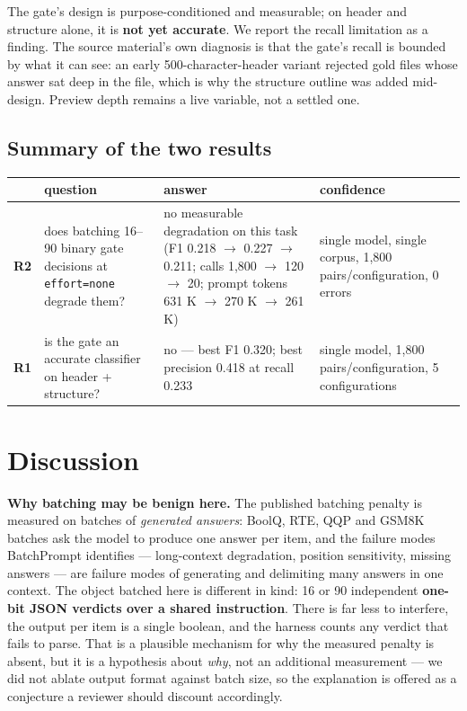 \documentclass[11pt,a4paper]{article}
\begin{document}
The gate's design is purpose-conditioned and measurable; on header and structure alone, it is \textbf{not yet accurate}. We report the recall limitation as a finding. The source material's own diagnosis is that the gate's recall is bounded by what it can see: an early 500-character-header variant rejected gold files whose answer sat deep in the file, which is why the structure outline was added mid-design. Preview depth remains a live variable, not a settled one.

\subsection{Summary of the two results}


\begin{center}
\begin{tabular}{@{}>{\raggedright\arraybackslash}p{}>{\raggedright\arraybackslash}p{}>{\raggedright\arraybackslash}p{}>{\raggedright\arraybackslash}p{}@{}}
\hline
\textbf{} & \textbf{question} & \textbf{answer} & \textbf{confidence} \\ \hline
\textbf{R2} & does batching 16--90 binary gate decisions at \texttt{effort=none} degrade them? & no measurable degradation on this task (F1 0.218 $\to$ 0.227 $\to$ 0.211; calls 1,800 $\to$ 120 $\to$ 20; prompt tokens 631 K $\to$ 270 K $\to$ 261 K) & single model, single corpus, 1,800 pairs/configuration, 0 errors \\ \hline
\textbf{R1} & is the gate an accurate classifier on header + structure? & no --- best F1 0.320; best precision 0.418 at recall 0.233 & single model, 1,800 pairs/configuration, 5 configurations \\ \hline
\end{tabular}
\end{center}

\section{Discussion}

\textbf{Why batching may be benign here.} The published batching penalty is measured on batches of \emph{generated answers}: BoolQ, RTE, QQP and GSM8K batches ask the model to produce one answer per item, and the failure modes BatchPrompt identifies --- long-context degradation, position sensitivity, missing answers --- are failure modes of generating and delimiting many answers in one context. The object batched here is different in kind: 16 or 90 independent \textbf{one-bit JSON verdicts over a shared instruction}. There is far less to interfere, the output per item is a single boolean, and the harness counts any verdict that fails to parse. That is a plausible mechanism for why the measured penalty is absent, but it is a hypothesis about \emph{why}, not an additional measurement --- we did not ablate output format against batch size, so the explanation is offered as a conjecture a reviewer should discount accordingly.
\end{document}
